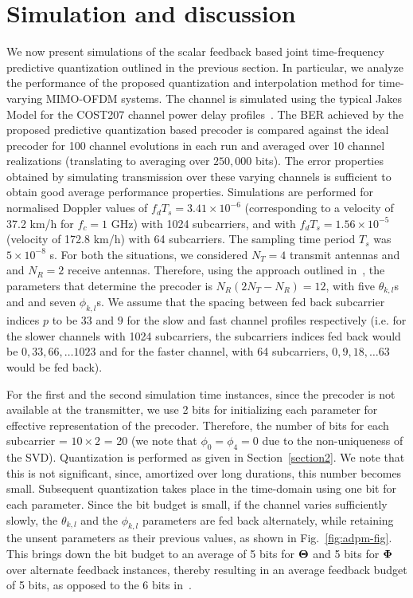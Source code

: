 \documentclass[journal,10pt,twocolumn]{IEEEtran}
\begin{document}
\section{Simulation and discussion}
\label{section3}
We now present simulations of the scalar feedback based joint
time-frequency predictive quantization outlined in the previous
section. In particular, we analyze the performance of the proposed
quantization and interpolation method for time-varying MIMO-OFDM
systems. The channel is simulated using the typical Jakes Model
for the COST207 channel power delay
profiles~\cite{molisch2006cost259}. The BER achieved by
the proposed predictive quantization based precoder is compared
against the ideal precoder for 100 channel evolutions in each run and
averaged over 10 channel realizations (translating to averaging over $250,000$ bits). The error properties obtained by simulating transmission over these varying channels is sufficient to obtain good average performance properties. Simulations are performed for
normalised Doppler values of $f_dT_s = 3.41\times 10^{-6}$ (corresponding
to a velocity of 37.2 km/h for $f_c = 1$ GHz) with 1024 subcarriers, and with
$f_dT_s = 1.56 \times 10^{-5}$ (velocity of 172.8 km/h) with 64
subcarriers. The sampling time period $T_s$ was $5\times10^{-8}$
s. For both the situations, we considered $N_T=4$ transmit antennas
and and $N_R=2$ receive antennas. Therefore, using the approach
outlined in~\cite{4114278}, the parameters that determine the precoder is
$N_{R}(2N_{T} - N_R) = 12$, with five $\theta_{k,l}$s and and seven
$\phi_{k,l}$s. We assume that the spacing between fed back subcarrier
indices $p$ to be $33$ and $9$ for the slow and fast channel profiles
respectively (i.e. for the slower channels with 1024 subcarriers, the
subcarriers indices fed back would be $0, 33, 66, \ldots 1023$ and for
the faster channel, with 64 subcarriers, $0, 9, 18, \ldots 63$ would
be fed back).

For the first and the second simulation time instances, since the
precoder is not available at the transmitter, we use 2 bits for
initializing each parameter for effective representation of the
precoder. Therefore, the number of bits for each subcarrier =
$10\times 2$ = 20 (we note that $\phi_0 = \phi_4 = 0$ due to the
non-uniqueness of the SVD). Quantization is performed as given in
Section~\ref{section2}. We note that this is not significant, since,
amortized over long durations, this number becomes small. Subsequent
quantization takes place in the time-domain using one bit for each
parameter. Since the bit budget is small, if the channel varies
sufficiently slowly, the $\theta_{k,l}$ and the $\phi_{k,l}$ parameters
are fed back alternately, while retaining the unsent parameters as
their previous values, as shown in
Fig.~\ref{fig:adpm-fig}.
This brings down the bit budget to an average of 5 bits for
$\bf{\Theta}$ and 5 bits for $\bf{\Phi}$ over alternate feedback
instances, thereby resulting in an average feedback budget of 5 bits,
as opposed to the 6 bits in~\cite{Gupt1905:Predictive}.
\end{document}

